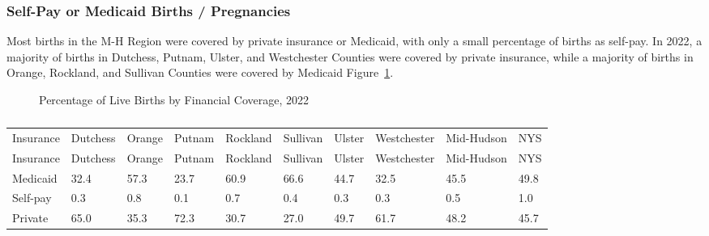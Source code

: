 \documentclass[
  english,
  letterpaper,
]{report}
\begin{document}
\subsubsection{Self-Pay or Medicaid Births /
Pregnancies}\label{self-pay-or-medicaid-births-pregnancies}

Most births in the M-H Region were covered by private insurance or
Medicaid, with only a small percentage of births as self-pay. In 2022, a
majority of births in Dutchess, Putnam, Ulster, and Westchester Counties
were covered by private insurance, while a majority of births in Orange,
Rockland, and Sullivan Counties were covered by Medicaid
Figure~\ref{fig-financial-coverage-liveb-percent}.

\begin{figure}


\caption{\label{fig-financial-coverage-liveb-percent}Percentage of Live
Births by Financial Coverage, 2022}

\end{figure}%

\begin{longtable}[]{@{}llllllllll@{}}

\caption{\label{tbl-financial-coverage-liveb-percent}Percentage of Live
Births by Financial Coverage, 2022}

\tabularnewline

\caption{}\label{T_9e364}\tabularnewline
\toprule\noalign{}
Insurance & Dutchess & Orange & Putnam & Rockland & Sullivan & Ulster &
Westchester & Mid-Hudson & NYS \\
\midrule\noalign{}
\endfirsthead
\toprule\noalign{}
Insurance & Dutchess & Orange & Putnam & Rockland & Sullivan & Ulster &
Westchester & Mid-Hudson & NYS \\
\midrule\noalign{}
\endhead
\bottomrule\noalign{}
\endlastfoot
Medicaid & 32.4 & 57.3 & 23.7 & 60.9 & 66.6 & 44.7 & 32.5 & 45.5 &
49.8 \\
Self-pay & 0.3 & 0.8 & 0.1 & 0.7 & 0.4 & 0.3 & 0.3 & 0.5 & 1.0 \\
Private & 65.0 & 35.3 & 72.3 & 30.7 & 27.0 & 49.7 & 61.7 & 48.2 &
45.7 \\

\end{longtable}
\end{document}
